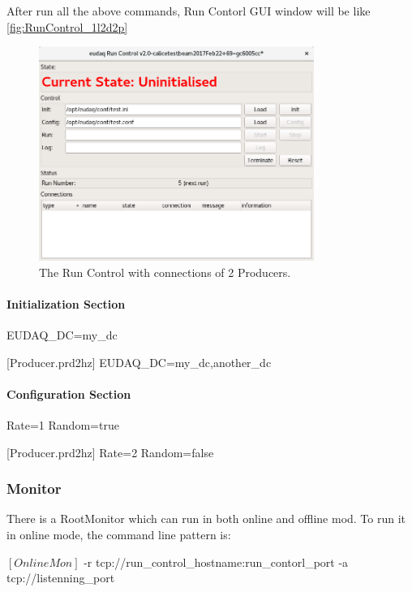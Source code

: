 After run all the above commands, Run Contorl GUI window will be like \autoref{fig:RunControl_1l2d2p}

\begin{figure}[htb]
  \begin{center}
    \includegraphics[width=0.8\textwidth]{src/images/RunControl}
    \caption{The Run Control with connections of 2 Producers.}
    \label{fig:RunControl_1l2d2p}
  \end{center}
\end{figure}

\paragraph{Initialization Section}
\begin{listing}
EUDAQ_DC=my_dc

[Producer.prd2hz]
EUDAQ_DC=my_dc,another_dc
\end{listing}

\paragraph{Configuration Section}
\begin{listing}
Rate=1
Random=true

[Producer.prd2hz]
Rate=2
Random=false
\end{listing}


\subsubsection{Monitor}
\label{sec:onlinemonitor}
There is a RootMonitor which can run in both online and offline mod.
To run it in online mode, the command line pattern is:
\begin{listing}[mybash]
$[OnlineMon]$ -r tcp://{run_control_hostname}:{run_contorl_port} -a tcp://{listenning_port}
\end{listing}

